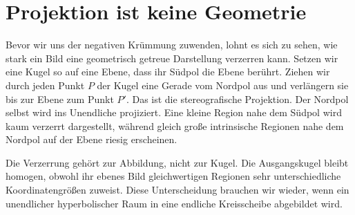 \begin{classroomqa}\end{classroomqa}

\section{Projektion ist keine Geometrie}

Bevor wir uns der negativen Krümmung zuwenden, lohnt es sich zu sehen, wie stark ein Bild eine geometrisch getreue Darstellung verzerren kann. Setzen wir eine Kugel so auf eine Ebene, dass ihr Südpol die Ebene berührt. Ziehen wir durch jeden Punkt \(P\) der Kugel eine Gerade vom Nordpol aus und verlängern sie bis zur Ebene zum Punkt \(P'\). Das ist die stereografische Projektion. Der Nordpol selbst wird ins Unendliche projiziert. Eine kleine Region nahe dem Südpol wird kaum verzerrt dargestellt, während gleich große intrinsische Regionen nahe dem Nordpol auf der Ebene riesig erscheinen.

Die Verzerrung gehört zur Abbildung, nicht zur Kugel. Die Ausgangskugel bleibt homogen, obwohl ihr ebenes Bild gleichwertigen Regionen sehr unterschiedliche Koordinatengrößen zuweist. Diese Unterscheidung brauchen wir wieder, wenn ein unendlicher hyperbolischer Raum in eine endliche Kreisscheibe abgebildet wird.

